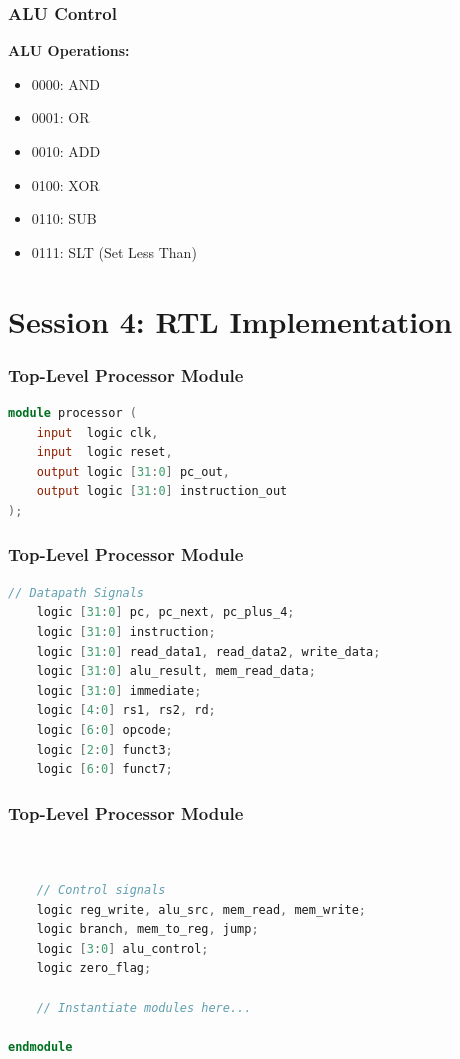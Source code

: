 \documentclass[aspectratio=169,xcolor=dvipsnames]{beamer}
\begin{document}
\begin{frame}
\frametitle{ALU Control}
\textbf{ALU Operations:}
\begin{itemize}
    \item 0000: AND
    \item 0001: OR
    \item 0010: ADD
    \item 0100: XOR
    \item 0110: SUB
    \item 0111: SLT (Set Less Than)
\end{itemize}
\end{frame}

\section{Session 4: RTL Implementation}

\begin{frame}[fragile]
\frametitle{Top-Level Processor Module}
\begin{lstlisting}[language=Verilog]
module processor (
    input  logic clk,
    input  logic reset,
    output logic [31:0] pc_out,
    output logic [31:0] instruction_out
);

\end{lstlisting}
\end{frame}

\begin{frame}[fragile]
\frametitle{Top-Level Processor Module}
\begin{lstlisting}[language=Verilog]
    // Datapath Signals
    logic [31:0] pc, pc_next, pc_plus_4;
    logic [31:0] instruction;
    logic [31:0] read_data1, read_data2, write_data;
    logic [31:0] alu_result, mem_read_data;
    logic [31:0] immediate;
    logic [4:0] rs1, rs2, rd;
    logic [6:0] opcode;
    logic [2:0] funct3;
    logic [6:0] funct7;
\end{lstlisting}
\end{frame}

\begin{frame}[fragile]
\frametitle{Top-Level Processor Module}
\begin{lstlisting}[language=Verilog]


    // Control signals
    logic reg_write, alu_src, mem_read, mem_write;
    logic branch, mem_to_reg, jump;
    logic [3:0] alu_control;
    logic zero_flag;

    // Instantiate modules here...

endmodule
\end{lstlisting}
\end{frame}
\end{document}
